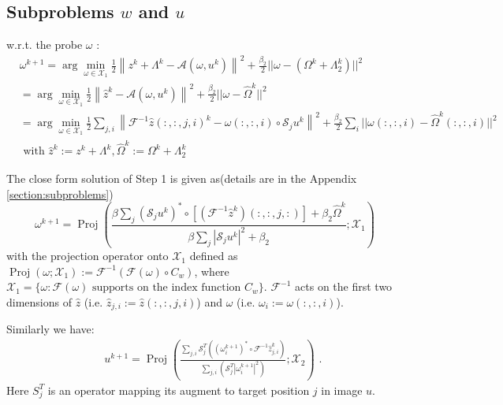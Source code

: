 \documentclass{article}
\numberwithin{equation}{section}
\begin{document}
\subsection{Subproblems $w$ and $u$}
 w.r.t. the probe $\omega$ :
$$
\begin{aligned}
&\omega^{k+1}=\arg \min _{\omega \in \mathcal{X}_{1}} \frac{1}{2}\left\|z^{k} + \Lambda^k -\mathcal{A}\left(\omega, u^{k}\right)\right\|^{2} + \frac{\beta_{2}}{2}||\omega - (\Omega^k + \Lambda_2^k)||^2\\
&=\arg \min _{\omega \in \mathcal{X}_{1}} \frac{1}{2}\left\|\hat{z}^{k}-\mathcal{A}\left(\omega, u^{k}\right)\right\|^{2}
+ \frac{\beta_{2}}{2}||\omega - \hat{\Omega}^k||^2\\
&=\arg \min _{\omega \in \mathcal{X}_{1}} \frac{1}{2} \sum_{j,i}\left\|\mathcal{F}^{-1} \hat{z}(:,:,j,i)^{k}-\omega(:,:,i) \circ \mathcal{S}_{j} u^{k}\right\|^{2}
+ \frac{\beta_2}{2} \sum_i ||\omega(:,:,i) - \hat{\Omega}^k(:,:,i)||^2\\
& \text { with } \hat{z}^{k}:=z^{k}+\Lambda^{k}, \hat{\Omega}^k := \Omega^k + \Lambda_2^k
\end{aligned}
$$
 
The close form solution of Step 1 is given as(details are in the Appendix \ref{section:subproblems})
\begin{equation}
\omega^{k+1}=\operatorname{Proj}\left(\frac{ \beta\sum_{j}\left(\mathcal{S}_{j} u^{k}\right)^{*} \circ [ \left(\mathcal{F}^{-1} \hat{z}^k\right)(:,:,j,:) ]
+ \beta_2 \hat{\Omega}^k}{ \beta \sum_{j}\left|\mathcal{S}_{j} u^{k}\right|^{2}+\beta_2} ; \mathcal{X}_{1}\right)
\label{omegaup}
\end{equation}
with the projection operator  onto $\mathcal{X}_{1}$ defined as $\operatorname{Proj}\left(\omega ;\mathcal{X}_{1}\right):= \mathcal{F}^{-1}( \mathcal{F}(\omega) \circ C_w)$, where $\mathcal{X}_{1}=\{\omega : \mathcal{F}(\omega) \mbox{ supports on the index function } C_w \}$. $\mathcal{F}^{-1}$ acts on the first two dimensions of $\hat{z}$ (i.e. $\hat{z}_{j,i} :=\hat{z}(:,:,j,i)$) and $\omega$ (i.e. $\omega_i := \omega(:,:,i)$).

Similarly we have:
\begin{equation}
\begin{aligned}
&\quad u^{k+1}=\operatorname{Proj}\left(\frac{\sum_{j,i} \mathcal{S}_{j}^{T}\left(\left(\omega_i^{k+1}\right)^{*} \circ \mathcal{F}^{-1} \hat{z}_{j,i}^{k}\right)}{\sum_{j,i}\left(\mathcal{S}_{j}^{T}\left|\omega_i^{k+1}\right|^{2}\right)} ; \mathcal{X}_{2}\right) \text { . }
\end{aligned}
\label{uup}
\end{equation}
Here $S_j^T$ is an operator mapping its augment to target position $j$ in image $u$. 
\end{document}
